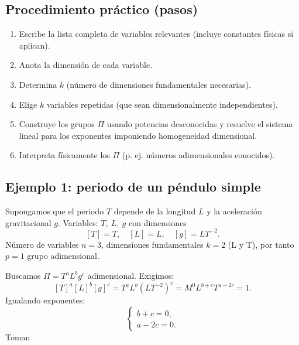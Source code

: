 \subsection{Procedimiento práctico (pasos)}
\begin{enumerate}
  \item Escribe la lista completa de variables relevantes (incluye constantes físicas si aplican).
  \item Anota la dimensión de cada variable.
  \item Determina $k$ (número de dimensiones fundamentales necesarias).
  \item Elige $k$ variables repetidas (que sean dimensionalmente independientes).
  \item Construye los grupos $\Pi$ usando potencias desconocidas y resuelve el sistema lineal para los exponentes imponiendo homogeneidad dimensional.
  \item Interpreta físicamente los $\Pi$ (p. ej. números adimensionales conocidos).
\end{enumerate}

\subsection{Ejemplo 1: periodo de un péndulo simple}
Supongamos que el periodo $T$ depende de la longitud $L$ y la aceleración gravitacional $g$. Variables: $T,\ L,\ g$ con dimensiones
\[
[T]=T,\quad [L]=L,\quad [g]=LT^{-2}.
\]
Número de variables $n=3$, dimensiones fundamentales $k=2$ (L y T), por tanto $p=1$ grupo adimensional.

Buscamos $\Pi = T^a L^b g^c$ adimensional. Exigimos:
\[
[T]^a [L]^b [g]^c = T^{a} L^{b} (L T^{-2})^{c} = M^{0} L^{b+c} T^{a-2c} = 1.
\]
Igualando exponentes:
\[
\begin{cases}
b+c=0,\\
a-2c=0.
\end{cases}
\]
Toman
